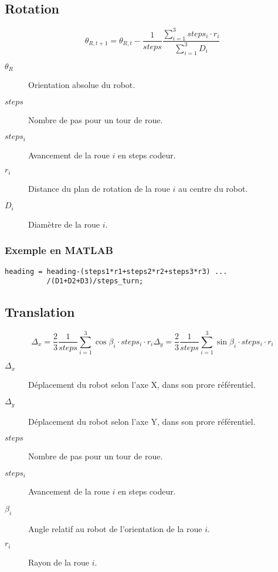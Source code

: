 \documentclass[a4paper]{paper}
\begin{document}
\subsection{Rotation}
\begin{equation}
    \theta_{R, t+1} = \theta_{R, t} - \frac{1}{steps} \frac{\sum\limits_{i=1}^3 steps_i \cdot r_i}{\sum\limits_{i=1}^3 D_i}
    \label{eqn:reverse-heading}
\end{equation}
\begin{description}
    \item[$\theta_R$] Orientation absolue du robot.
    \item[$steps$] Nombre de pas pour un tour de roue.
    \item[$steps_i$] Avancement de la roue $i$ en steps codeur.
    \item[$r_i$] Distance du plan de rotation de la roue $i$ au centre du robot.
    \item[$D_i$] Diamètre de la roue $i$.
\end{description}

\subsubsection{Exemple en MATLAB}
\begin{lstlisting}
heading = heading-(steps1*r1+steps2*r2+steps3*r3) ...
          /(D1+D2+D3)/steps_turn;
\end{lstlisting}

\subsection{Translation}
\begin{subequations}
    \begin{equation}
    \Delta_x = \frac{2}{3} \frac{1}{steps} \sum\limits_{i=1}^3 \cos \beta_i \cdot steps_i \cdot r_i 
    \end{equation}
    \begin{equation}
    \Delta_y = \frac{2}{3} \frac{1}{steps} \sum\limits_{i=1}^3 \sin \beta_i \cdot steps_i \cdot r_i 
    \end{equation}

    \label{eqn:reverse-translation}
\end{subequations}
\begin{description}
    \item[$\Delta_x$] Déplacement du robot selon l'axe X, dans son prore référentiel.
    \item[$\Delta_y$] Déplacement du robot selon l'axe Y, dans son prore référentiel.
    \item[$steps$] Nombre de pas pour un tour de roue.
    \item[$steps_i$] Avancement de la roue $i$ en steps codeur.
    \item[$\beta_i$] Angle relatif au robot de l'orientation de la roue $i$.
    \item[$r_i$] Rayon de la roue $i$.
\end{description}
\end{document}
